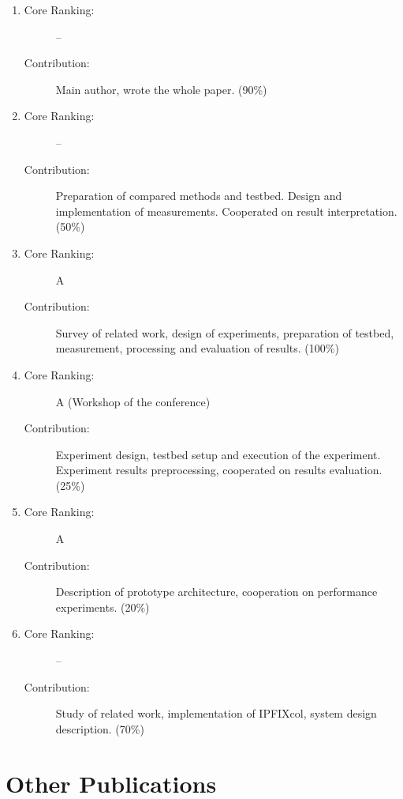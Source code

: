 \begin{enumerate}
  \item {}
  \begin{description}
    \item[Core Ranking:] --
    \item[Contribution:] Main author, wrote the whole paper. (90\%)
  \end{description}
  
  \item {}
  \begin{description}
    \item[Core Ranking:] --
    \item[Contribution:] Preparation of compared methods and testbed. Design and implementation of measurements. Cooperated on result interpretation. (50\%)
  \end{description}
  
  \item {}
  \begin{description}
    \item[Core Ranking:] A
    \item[Contribution:] Survey of related work, design of experiments, preparation of testbed, measurement, processing and evaluation of results. (100\%)
  \end{description}
  
  \item {}
  \begin{description}
    \item[Core Ranking:] A (Workshop of the conference)
    \item[Contribution:] Experiment design, testbed setup and execution of the experiment. Experiment results preprocessing, cooperated on results evaluation. (25\%)
  \end{description}
  
  \item {}
  \begin{description}
    \item[Core Ranking:] A
    \item[Contribution:] Description of prototype architecture, cooperation on performance experiments. (20\%)
  \end{description}
  
  \item {}
  \begin{description}
    \item[Core Ranking:] --
    \item[Contribution:] Study of related work, implementation of IPFIXcol, system design description. (70\%)
  \end{description}

\end{enumerate}


\section{Other Publications}